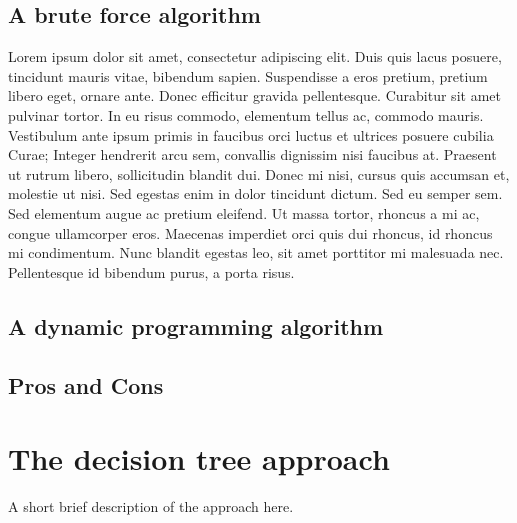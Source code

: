 \documentclass[12pt,a4paper,oneside]{report}
\begin{document}
\section{A brute force algorithm}
Lorem ipsum dolor sit amet, consectetur adipiscing elit. Duis quis lacus posuere, tincidunt mauris vitae, bibendum sapien. Suspendisse a eros pretium, pretium libero eget, ornare ante. Donec efficitur gravida pellentesque. Curabitur sit amet pulvinar tortor. In eu risus commodo, elementum tellus ac, commodo mauris. Vestibulum ante ipsum primis in faucibus orci luctus et ultrices posuere cubilia Curae; Integer hendrerit arcu sem, convallis dignissim nisi faucibus at. Praesent ut rutrum libero, sollicitudin blandit dui. Donec mi nisi, cursus quis accumsan et, molestie ut nisi. Sed egestas enim in dolor tincidunt dictum. Sed eu semper sem. Sed elementum augue ac pretium eleifend. Ut massa tortor, rhoncus a mi ac, congue ullamcorper eros. Maecenas imperdiet orci quis dui rhoncus, id rhoncus mi condimentum. Nunc blandit egestas leo, sit amet porttitor mi malesuada nec. Pellentesque id bibendum purus, a porta risus.

\section{A dynamic programming algorithm}

\section{Pros and Cons}


\chapter{The decision tree approach}
A short brief description of the approach here.
\end{document}

